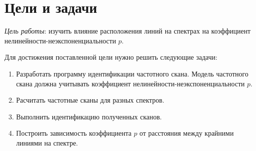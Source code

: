 \section{Цели и задачи}

\emph{Цель работы}: изучить влияние расположения линий на спектрах на 
коэффициент нелинейности-неэкспоненциальности $p$.

Для достижения поставленной цели нужно решить следующие задачи:
\begin{enumerate}
    \item Разработать программу идентификации частотного скана. Модель
    частотного скана должна учитывать коэффициент 
    нелинейности-неэкспоненциальности $p$.
    \item Расчитать частотные сканы для разных спектров.
    \item Выполнить идентификацию полученных сканов.
    \item Построить зависимость коэффициента $p$ от расстояния между 
    крайними линиями на спектре.
\end{enumerate}